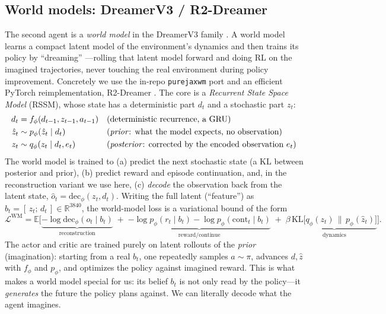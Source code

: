 \documentclass[11pt]{article}
\newcommand{\code}[1]{\texttt{\small #1}}
\newcommand{\R}{\mathbb{R}}
\newcommand{\E}{\mathbb{E}}
\begin{document}
\subsection{World models: DreamerV3 / R2-Dreamer}
The second agent is a \emph{world model} in the DreamerV3 family
\cite{hafner2023dreamerv3,ha2018world}. A world model learns a compact latent
model of the environment's dynamics and then trains its policy by ``dreaming''
---rolling that latent model forward and doing RL on the imagined trajectories,
never touching the real environment during policy improvement. Concretely we use
the in-repo \code{purejaxwm} port and an efficient PyTorch reimplementation,
R2-Dreamer \cite{morihira2026r2dreamer}. The core is a \emph{Recurrent State
Space Model} (RSSM), whose state has a deterministic part $d_t$ and a stochastic
part $z_t$:
\begin{align}
d_t &= f_\phi(d_{t-1}, z_{t-1}, a_{t-1}) && \text{(deterministic recurrence, a GRU)}\\
\hat z_t &\sim p_\phi(\hat z_t \mid d_t) && \text{(\emph{prior}: what the model expects, no observation)}\\
z_t &\sim q_\phi(z_t \mid d_t, e_t) && \text{(\emph{posterior}: corrected by the encoded observation $e_t$)}
\end{align}
The world model is trained to (a) predict the next stochastic state (a KL
between posterior and prior), (b) predict reward and episode continuation, and,
in the reconstruction variant we use here, (c) \emph{decode} the observation back
from the latent state, $\hat o_t = \mathrm{dec}_\phi(z_t, d_t)$. Writing the full
latent (``feature'') as $b_t = [\,z_t;\,d_t\,]\in\R^{3840}$, the world-model loss
is a variational bound of the form
\begin{equation}
\mathcal{L}^{\text{WM}} = \E\Big[\underbrace{-\log \mathrm{dec}_\phi(o_t\mid b_t)}_{\text{reconstruction}}
\;+\;\underbrace{-\log p_\phi(r_t\mid b_t)-\log p_\phi(\text{cont}_t\mid b_t)}_{\text{reward/continue}}
\;+\;\beta\,\underbrace{\mathrm{KL}\!\big[q_\phi(z_t)\,\|\,p_\phi(\hat z_t)\big]}_{\text{dynamics}}\Big].
\end{equation}
The actor and critic are trained purely on latent rollouts of the \emph{prior}
(imagination): starting from a real $b_t$, one repeatedly samples
$a\sim\pi$, advances $d,\hat z$ with $f_\phi$ and $p_\phi$, and optimizes the
policy against imagined reward. This is what makes a world model special for us:
its belief $b_t$ is not only read by the policy---it \emph{generates} the future
the policy plans against. We can literally decode what the agent imagines.
\end{document}
